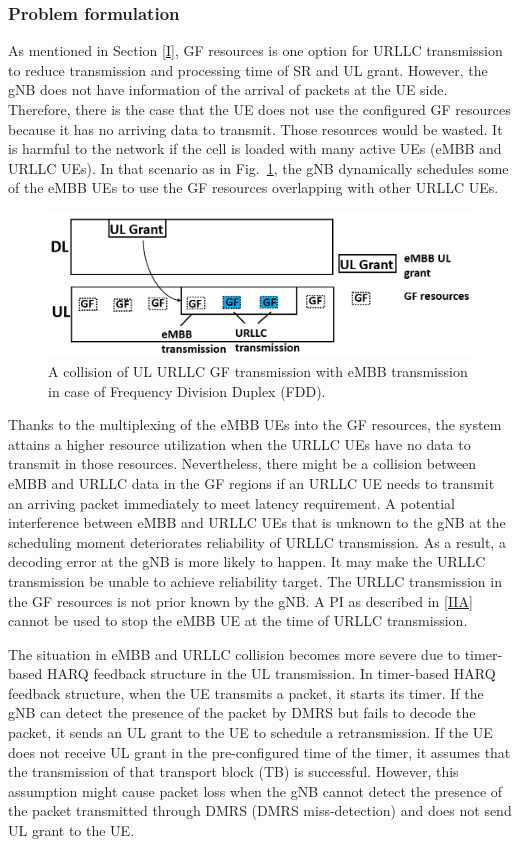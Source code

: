 \documentclass{ieeeaccess}
\begin{document}
\subsubsection{Problem formulation}\label{IIB1}
As mentioned in Section \ref{I}, GF resources is one option for URLLC transmission to reduce transmission and processing time of SR and UL grant. However, the gNB does not have information of the arrival of packets at the UE side. Therefore, there is the case that the UE does not use the configured GF resources because it has no arriving data to transmit. Those resources would be wasted. It is harmful to the network if the cell is loaded with many active UEs (eMBB and URLLC UEs). In that scenario as in Fig.~\ref{fig1}, the gNB dynamically schedules some of the eMBB UEs to use the GF resources overlapping with other URLLC UEs.

\begin{figure}[htbp]
\centerline{\includegraphics[scale=0.28]{fig1.PNG}}
\caption{A collision of UL URLLC GF transmission with eMBB transmission in case of Frequency Division Duplex (FDD).}
\label{fig1}
\end{figure}

Thanks to the multiplexing of the eMBB UEs into the GF resources, the system attains a higher resource utilization when the URLLC UEs have no data to transmit in those resources. Nevertheless, there might be a collision between eMBB and URLLC data in the GF regions if an URLLC UE needs to transmit an arriving packet immediately to meet latency requirement. A potential interference between eMBB and URLLC UEs that is unknown to the gNB at the scheduling moment deteriorates reliability of URLLC transmission. As a result, a decoding error at the gNB is more likely to happen. It may make the URLLC transmission be unable to achieve reliability target. The URLLC transmission in the GF resources is not prior known by the gNB. A PI as described in \ref{IIA} cannot be used to stop the eMBB UE at the time of URLLC transmission.

The situation in eMBB and URLLC collision becomes more severe due to timer-based HARQ feedback structure in the UL transmission. In timer-based HARQ feedback structure, when the UE transmits a packet, it starts its timer. If the gNB can detect the presence of the packet by DMRS but fails to decode the packet, it sends an UL grant to the UE to schedule a retransmission. If the UE does not receive UL grant in the pre-configured time of the timer, it assumes that the transmission of that transport block (TB) is successful. However, this assumption might cause packet loss when the gNB cannot detect the presence of the packet transmitted through DMRS (DMRS miss-detection) and does not send UL grant to the UE. 
\end{document}
